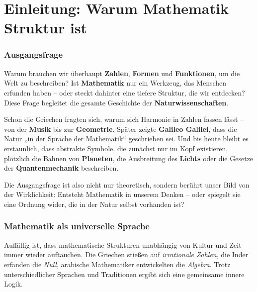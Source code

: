 \chapter{Einleitung: Warum Mathematik Struktur ist}
\label{chap:I_einfuehrung}
\setcounter{section}{1}
\setcounter{subsection}{0}
\setcounter{subsubsection}{1}
\setcounter{secnumdepth}{3}
\setlength{\parindent}{0pt}


\subsection{Ausgangsfrage}

Warum brauchen wir überhaupt \textbf{Zahlen}, \textbf{Formen} und \textbf{Funktionen}, um die Welt zu beschreiben? 
Ist \textbf{Mathematik} nur ein Werkzeug, das Menschen erfunden haben – oder steckt dahinter eine tiefere Struktur, die wir entdecken? 
Diese Frage begleitet die gesamte Geschichte der \textbf{Naturwissenschaften}.

Schon die Griechen fragten sich, warum sich Harmonie in Zahlen fassen lässt – von der \textbf{Musik} bis zur \textbf{Geometrie}. 
Später zeigte \textbf{Galileo Galilei}, dass die Natur „in der Sprache der Mathematik“ geschrieben sei.  
Und bis heute bleibt es erstaunlich, dass abstrakte Symbole, die zunächst nur im Kopf existieren, 
plötzlich die Bahnen von \textbf{Planeten}, die Ausbreitung des \textbf{Lichts} oder die Gesetze der \textbf{Quantenmechanik} beschreiben. 

Die Ausgangsfrage ist also nicht nur theoretisch, sondern berührt unser Bild von der Wirklichkeit: 
Entsteht Mathematik in unserem Denken – oder spiegelt sie eine Ordnung wider, die in der Natur selbst vorhanden ist?


\subsection{Mathematik als universelle Sprache}
\label{sec:1.2_universelle_sprache}

Auffällig ist, dass mathematische Strukturen 
unabhängig von Kultur und Zeit immer wieder auftauchen. 
Die Griechen stießen auf \emph{irrationale Zahlen}, 
die Inder erfanden die \emph{Null}, 
arabische Mathematiker entwickelten die \emph{Algebra}. 
Trotz unterschiedlicher Sprachen und Traditionen ergibt sich eine gemeinsame innere Logik. 

